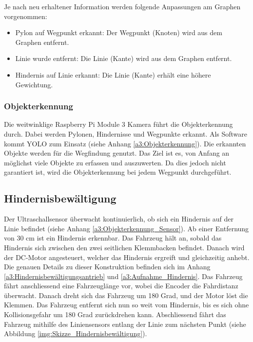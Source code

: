 \documentclass[../main.tex]{subfiles}
\begin{document}
Je nach neu erhaltener Information werden folgende Anpassungen am Graphen vorgenommen: \begin{itemize} 
  \item Pylon auf Wegpunkt erkannt: Der Wegpunkt (Knoten) wird aus dem Graphen entfernt.
  \item Linie wurde entfernt: Die Linie (Kante) wird aus dem Graphen entfernt. 
  \item Hindernis auf Linie erkannt: Die Linie (Kante) erhält eine höhere Gewichtung.
\end{itemize}

\subsubsection{Objekterkennung} \label{sub:Objekterkennung}
Die weitwinklige Raspberry Pi Module 3 Kamera führt die Objekterkennung durch. Dabei werden Pylonen, Hindernisse und Wegpunkte erkannt. Als Software kommt YOLO zum Einsatz (siehe Anhang \ref{a3:Objekterkennung}). Die erkannten Objekte werden für die Wegfindung genutzt. Das Ziel ist es, von Anfang an möglichst viele Objekte zu erfassen und auszuwerten. Da dies jedoch nicht garantiert ist, wird die Objekterkennung bei jedem Wegpunkt durchgeführt. 

\subsection{Hindernisbewältigung}
Der Ultraschallsensor überwacht kontinuierlich, ob sich ein Hindernis auf der Linie befindet (siehe Anhang \ref{a3:Objekterkennung_Sensor}). Ab einer Entfernung von 30 cm ist ein Hindernis erkennbar. Das Fahrzeug hält an, sobald das Hindernis sich zwischen den zwei seitlichen Klemmbacken befindet. Danach wird der DC-Motor angesteuert, welcher das Hindernis ergreift und gleichzeitig anhebt. Die genauen Details zu dieser Konstruktion befinden sich im Anhang \ref{a3:Hindernisbewältigungsantrieb} und \ref{a3:Aufnahme_Hindernis}.
Das Fahrzeug fährt anschliessend eine Fahrzeuglänge vor, wobei die Encoder die Fahrdistanz überwacht. Danach dreht sich das Fahrzeug um 180 Grad, und der Motor löst die Klemmen. Das Fahrzeug entfernt sich nun so weit vom Hindernis, bis es sich ohne Kollisionsgefahr um 180 Grad zurückdrehen kann. Abschliessend fährt das Fahrzeug mithilfe des Liniensensors entlang der Linie zum nächsten Punkt (siehe Abbildung \ref{img:Skizze_Hindernisbewältigung}).
\end{document}
